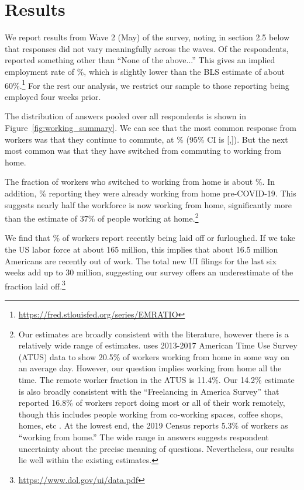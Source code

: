 \documentclass[12pt]{article}
\begin{document}
\section{Results}
We report results from Wave 2 (May) of the survey, noting in section 2.5 below that responses did not vary meaningfully across the waves. Of the respondents, \numObsWorking{} reported something other than ``None of the above...''
This gives an implied employment rate of \LFPRhat{}\%, which is slightly lower than the BLS estimate of about 60\%.\footnote{
  \url{https://fred.stlouisfed.org/series/EMRATIO}
}
For the rest our analysis, we restrict our sample to those reporting being employed four weeks prior.

The distribution of answers pooled over all respondents is shown in Figure~\ref{fig:working_summary}. 
We can see that the most common response from workers was that they continue to commute, at \stillCommute{}\% (95\% CI is [\stillCommuteLB,\stillCommuteUB]). 
But the next most common was that they have switched from commuting to working from home. 

The fraction of workers who switched to working from home is about \WFH{}\%.  In addition,  \alreadyWFH{}\% reporting they were already working from home pre-COVID-19.  This suggests nearly half the workforce is now working from home, significantly more than the \cite{dingel2020} estimate of 37\% of people working at home.\footnote{
Our estimates are broadly consistent with the literature, however there is a relatively wide range of estimates.
\cite{krantz2019did} uses 2013-2017 American Time Use Survey (ATUS) data to show 20.5\% of workers working from home in some way on an average day.
However, our question implies working from home all the time.
The remote worker fraction in the ATUS is 11.4\%.
Our 14.2\% estimate is also broadly consistent with the ``Freelancing in America Survey'' that reported 16.8\% of workers report doing most or all of their work remotely, though this includes people working from co-working spaces, coffee shops, homes, etc \citep{ozimek2020}.
At the lowest end, the 2019 Census reports 5.3\% of workers as ``working from home.''
The wide range in answers suggests respondent uncertainty about the precise meaning of questions. Nevertheless, our results lie well within the existing estimates.
}

We find that \LaidOff{}\% of workers report recently being laid off or furloughed. If we take the US labor force at about 165 million, this implies that about 16.5 million Americans are recently out of work.
The total new UI filings for the last six weeks add up to 30 million, suggesting our survey offers an underestimate of the fraction laid off.\footnote{
  \url{https://www.dol.gov/ui/data.pdf}
}
\end{document}
